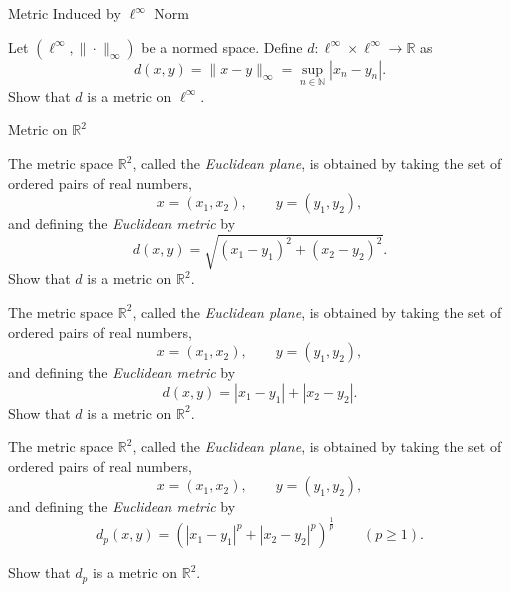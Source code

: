 \documentclass[12pt, a4paper]{article}
\begin{document}
\clearpage

\begin{heading}
    Metric Induced by $\ell^\infty$ Norm
\end{heading}

\vspace{10pt}

\begin{theorem}
    Let $(\ell^\infty,\|\cdot\|_\infty)$ be a normed space. Define $d:\ell^\infty\times \ell^\infty\to\mathbb{R}$ as
    \[
        d(x,y)=\|x-y\|_\infty=\sup_{n\in\mathbb{N}}|x_n-y_n|.
    \]
    Show that $d$ is a metric on $\ell^\infty$.
\end{theorem}

\clearpage

\begin{heading}
    Metric on $\mathbb{R}^2$
\end{heading}

\vspace{10pt}

\begin{theorem}
    The metric space $\mathbb{R}^2$, called the \emph{Euclidean plane}, is obtained by
    taking the set of ordered pairs of real numbers,
    \[
    x=(x_1,x_2), \qquad y=(y_1,y_2),
    \]
    and defining the \emph{Euclidean metric} by
    \[
    d(x,y)=\sqrt{(x_1-y_1)^2+(x_2-y_2)^2}.
    \]
    Show that $d$ is a metric on $\mathbb{R}^2$.
\end{theorem}

\clearpage

\begin{theorem}
    The metric space $\mathbb{R}^2$, called the \emph{Euclidean plane}, is obtained by
    taking the set of ordered pairs of real numbers,
    \[
    x=(x_1,x_2), \qquad y=(y_1,y_2),
    \]
    and defining the \emph{Euclidean metric} by
    \[
    d(x,y)=|x_1-y_1|+|x_2-y_2|.
    \]
    Show that $d$ is a metric on $\mathbb{R}^2$.
\end{theorem}

\clearpage

\begin{theorem}
    The metric space $\mathbb{R}^2$, called the \emph{Euclidean plane}, is obtained by
    taking the set of ordered pairs of real numbers,
    \[
    x=(x_1,x_2), \qquad y=(y_1,y_2),
    \]
    and defining the \emph{Euclidean metric} by
    \[
    d_p(x,y)=\left(|x_1-y_1|^p+|x_2-y_2|^p\right)^{\frac{1}{p}} \qquad (p\ge 1).
    \]

    Show that $d_p$ is a metric on $\mathbb{R}^2$.
\end{theorem}
\end{document}
